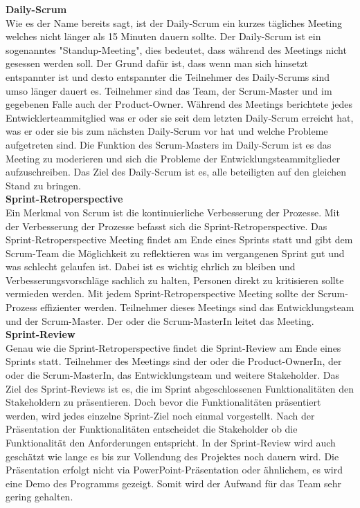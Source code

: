 		\textbf{Daily-Scrum} \\
		Wie es der Name bereits sagt, ist der Daily-Scrum ein kurzes tägliches Meeting welches nicht länger als 15 Minuten dauern sollte. Der Daily-Scrum ist ein sogenanntes "Standup-Meeting", dies bedeutet, dass während des Meetings nicht gesessen werden soll. Der Grund dafür ist, dass wenn man sich hinsetzt entspannter ist und desto entspannter die Teilnehmer des Daily-Scrums sind umso länger dauert es. 
		Teilnehmer sind das Team, der Scrum-Master und im gegebenen Falle auch der Product-Owner. Während des Meetings berichtete jedes Entwicklerteammitglied was er oder sie seit dem letzten Daily-Scrum erreicht hat, was er oder sie bis zum nächsten Daily-Scrum vor hat und welche Probleme aufgetreten sind. Die Funktion des Scrum-Masters im Daily-Scrum ist es das Meeting zu moderieren und sich die Probleme der Entwicklungsteammitglieder aufzuschreiben.
		Das Ziel des Daily-Scrum ist es, alle beteiligten auf den gleichen Stand zu bringen. \textcite{ScrumDailyScrum} \\
		
		\textbf{Sprint-Retroperspective} \\
		Ein Merkmal von Scrum ist die kontinuierliche Verbesserung der Prozesse. Mit der Verbesserung der Prozesse befasst sich die Sprint-Retroperspective. Das Sprint-Retroperspective Meeting findet am Ende eines Sprints statt und gibt dem Scrum-Team die Möglichkeit zu reflektieren was im vergangenen Sprint gut und was schlecht gelaufen ist. Dabei ist es wichtig ehrlich zu bleiben und Verbesserungsvorschläge sachlich zu halten, Personen direkt zu kritisieren sollte vermieden werden. Mit jedem Sprint-Retroperspective Meeting sollte der Scrum-Prozess effizienter werden. 
		Teilnehmer dieses Meetings sind das Entwicklungsteam und der Scrum-Master. Der oder die Scrum-MasterIn leitet das Meeting. \textcite{ScrumScrum-Retroperspective} \\
		
		\textbf{Sprint-Review} \\
		Genau wie die Sprint-Retroperspective findet die Sprint-Review am Ende eines Sprints statt. Teilnehmer des Meetings sind der oder die Product-OwnerIn, der oder die Scrum-MasterIn, das Entwicklungsteam und weitere Stakeholder. Das Ziel des Sprint-Reviews ist es, die im Sprint abgeschlossenen Funktionalitäten den Stakeholdern zu präsentieren. Doch bevor die Funktionalitäten präsentiert werden, wird jedes einzelne Sprint-Ziel noch einmal vorgestellt. Nach der Präsentation der Funktionalitäten entscheidet die Stakeholder ob die Funktionalität den Anforderungen entspricht. In der Sprint-Review wird auch geschätzt wie lange es bis zur Vollendung des Projektes noch dauern wird.
		Die Präsentation erfolgt nicht via PowerPoint-Präsentation oder ähnlichem, es wird eine Demo des Programms gezeigt. Somit wird der Aufwand für das Team sehr gering gehalten.  \textcite{ScrumScrum-Review} \\
		
